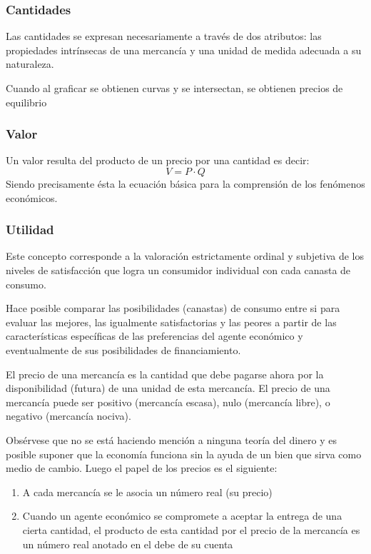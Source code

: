\subsubsection{Cantidades}
Las cantidades se expresan necesariamente a través de dos atributos: las propiedades intrínsecas de una mercancía y una unidad de medida adecuada a su naturaleza.

Cuando al graficar se obtienen curvas y se intersectan, se obtienen precios de equilibrio
\subsubsection{Valor}
Un valor resulta del producto de un precio por una cantidad es decir:
\begin{equation}
    V = P \cdot Q
\end{equation}
Siendo precisamente ésta la ecuación básica para la comprensión de los fenómenos económicos.

\subsubsection{Utilidad} 
Este concepto corresponde a la valoración estrictamente ordinal y subjetiva de los niveles de satisfacción que logra un consumidor individual con cada canasta de consumo.

Hace posible comparar las posibilidades (canastas) de consumo entre si para evaluar las mejores, las igualmente satisfactorias y las peores a partir de las características específicas de las preferencias del agente económico y eventualmente de sus posibilidades de  financiamiento.

El precio de una mercancía es la cantidad que debe pagarse ahora por la disponibilidad (futura) de una unidad de esta mercancía. El precio de una mercancía puede ser positivo (mercancía escasa), nulo (mercancía libre), o negativo (mercancía nociva).

Obsérvese que no se está haciendo mención a ninguna teoría del dinero y es posible suponer que la economía funciona sin la ayuda de un bien que sirva como medio de cambio. Luego el papel de los precios es el siguiente:
\begin{enumerate}
    \item A cada mercancía se le asocia un número real (su precio)
    \item Cuando un agente económico se compromete a aceptar la entrega de una cierta cantidad, el producto de esta cantidad por el precio de la mercancía es un número real anotado en el debe de su cuenta
\end{enumerate}
